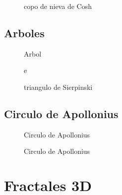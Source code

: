 \begin{figure}[!ht]
	\begin{center}
	\end{center}
	\caption{copo de nieva de Cosh}
\end{figure}






\subsection{Arboles}

\begin{figure}[!ht]
	\begin{center}

	\end{center}
	\caption{Arbol}\label{f}
\end{figure}

\begin{figure}[!ht]
	\begin{center}
	\end{center}
	\caption{e}
\end{figure}

\begin{figure}[!ht]
	\begin{center}

	\end{center}
	\caption{triangulo de Sierpinski}
\end{figure}


\subsection{Circulo de Apollonius}

\begin{figure}[!ht]
	\begin{center}

	\end{center}
	\caption{Circulo de Apollonius}
\end{figure}

\begin{figure}[!ht]
	\begin{center}

	\end{center}
	\caption{Circulo de Apollonius}
\end{figure}




\section{Fractales 3D}


